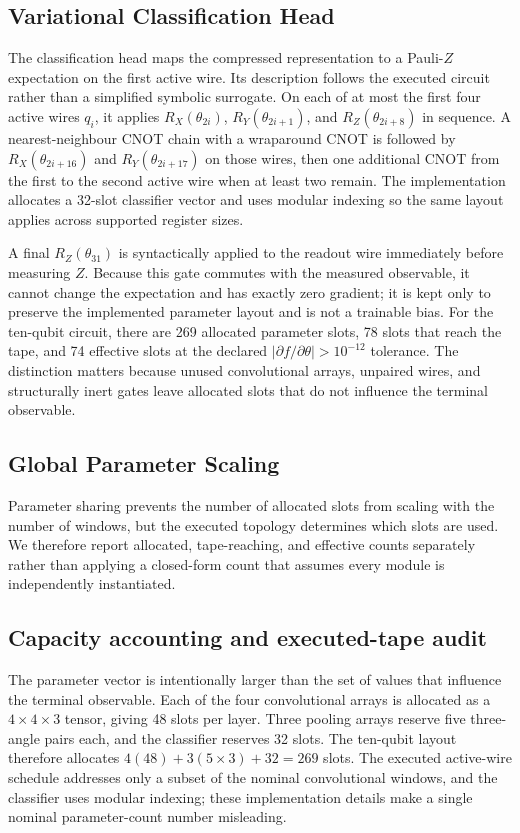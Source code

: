 \documentclass[conference]{IEEEtran}
\begin{document}
\subsection{Variational Classification Head}
The classification head maps the compressed representation to a Pauli-$Z$ expectation on the first active wire. Its description follows the executed circuit rather than a simplified symbolic surrogate. On each of at most the first four active wires $q_i$, it applies $R_X(\theta_{2i})$, $R_Y(\theta_{2i+1})$, and $R_Z(\theta_{2i+8})$ in sequence. A nearest-neighbour CNOT chain with a wraparound CNOT is followed by $R_X(\theta_{2i+16})$ and $R_Y(\theta_{2i+17})$ on those wires, then one additional CNOT from the first to the second active wire when at least two remain. The implementation allocates a 32-slot classifier vector and uses modular indexing so the same layout applies across supported register sizes.

A final $R_Z(\theta_{31})$ is syntactically applied to the readout wire immediately before measuring $Z$. Because this gate commutes with the measured observable, it cannot change the expectation and has exactly zero gradient; it is kept only to preserve the implemented parameter layout and is not a trainable bias. For the ten-qubit circuit, there are 269 allocated parameter slots, 78 slots that reach the tape, and 74 effective slots at the declared $|\partial f/\partial\theta|>10^{-12}$ tolerance. The distinction matters because unused convolutional arrays, unpaired wires, and structurally inert gates leave allocated slots that do not influence the terminal observable.

\subsection{Global Parameter Scaling}
Parameter sharing prevents the number of allocated slots from scaling with the number of windows, but the executed topology determines which slots are used. We therefore report allocated, tape-reaching, and effective counts separately rather than applying a closed-form count that assumes every module is independently instantiated.

\subsection{Capacity accounting and executed-tape audit}
\label{sec:capacity}
The parameter vector is intentionally larger than the set of values that
influence the terminal observable. Each of the four convolutional arrays is
allocated as a $4\times4\times3$ tensor, giving 48 slots per layer. Three
pooling arrays reserve five three-angle pairs each, and the classifier reserves
32 slots. The ten-qubit layout therefore allocates
$4(48)+3(5\times3)+32=269$ slots. The executed active-wire schedule addresses
only a subset of the nominal convolutional windows, and the classifier uses
modular indexing; these implementation details make a single nominal
parameter-count number misleading.
\end{document}

